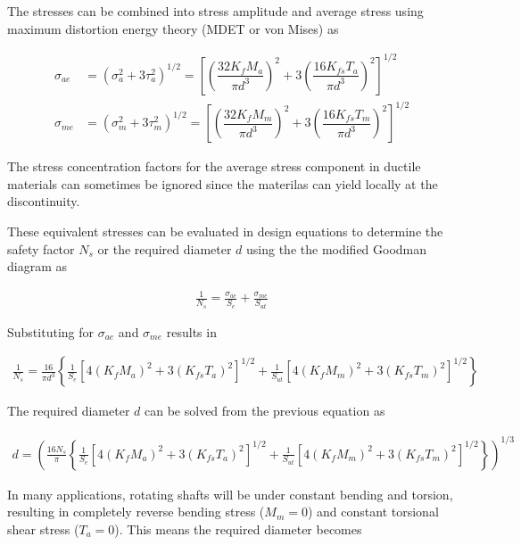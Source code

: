 \documentclass[
10pt,
a4paper,
openany,
svgnames,
]{book}
\begin{document}
The stresses can be combined into stress amplitude and average stress using maximum distortion energy theory (MDET or von Mises) as

\begin{align}
  \label{eq: von mises shaft stress}
  \sigma_{ae} &= \left( \sigma_a^2 + 3\tau_a^2 \right)^{1/2} = \left[ \left( \dfrac{32 K_fM_a}{\pi d^3} \right)^2 + 3\left( \dfrac{16 K_{fs} T_a}{\pi d^3} \right)^2 \right]^{1/2} \\
  \sigma_{me} &= \left( \sigma_m^2 + 3\tau_m^2 \right)^{1/2} = \left[ \left( \dfrac{32 K_fM_m}{\pi d^3} \right)^2 + 3\left( \dfrac{16 K_{fs} T_m}{\pi d^3} \right)^2 \right]^{1/2}
\end{align}

The stress concentration factors for the average stress component in ductile materials can sometimes be ignored since the materilas can yield locally at the discontinuity.

These equivalent stresses can be evaluated in design equations to determine the safety factor $N_s$ or the required diameter $d$ using the the modified Goodman diagram as

\begin{align*}
  \frac{1}{N_s} = \frac{\sigma_{ae}}{S_e} + \frac{\sigma_{me}}{S_{ut}}
\end{align*}

Substituting for $\sigma_{ae}$ and $\sigma_{me}$ results in

\begin{align*}
  \frac{1}{N_s} = \frac{16}{\pi d^3} \left\{ \frac{1}{S_e} \left[ 4 \left( K_f M_a \right)^2 + 3 \left( K_{fs} T_a \right)^2 \right]^{1/2} + \frac{1}{S_{ut}} \left[ 4 \left( K_f M_m \right)^2 + 3 \left( K_{fs} T_m \right)^2 \right]^{1/2} \right\}
\end{align*}

The required diameter $d$ can be solved from the previous equation as

\begin{align*}
  d = \left( \frac{16N_s}{\pi} \left\{ \frac{1}{S_e} \left[ 4 \left( K_f M_a \right)^2 + 3 \left( K_{fs} T_a \right)^2 \right]^{1/2} + \frac{1}{S_{ut}} \left[ 4 \left( K_f M_m \right)^2 + 3 \left( K_{fs} T_m \right)^2 \right]^{1/2} \right\} \right)^{1/3}
\end{align*}

In many applications, rotating shafts will be under constant bending and torsion, resulting in completely reverse bending stress ($M_m = 0$) and constant torsional shear stress ($T_a = 0$). This means the required diameter becomes
\end{document}

